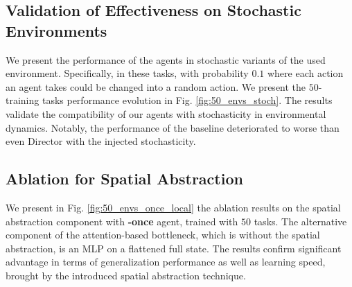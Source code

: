 \subsection{Validation of Effectiveness on Stochastic Environments}
We present the performance of the agents in stochastic variants of the used environment. Specifically, in these tasks, with probability $0.1$ where each action an agent takes could be changed into a random action. We present the $50$-training tasks performance evolution in Fig. \ref{fig:50_envs_stoch}. The results validate the compatibility of our agents with stochasticity in environmental dynamics. Notably, the performance of the baseline deteriorated to worse than even Director with the injected stochasticity.

\begin{figure*}[htbp]
\centering
\hfill
{}
\hfill
{}
\hfill
{}
\hfill
{}

\caption{\small \textbf{Generalization Performance of agents in \textbf{stochastic} environments}: $\epsilon$-greedy style randomness is added to each primitive action with $\epsilon=0.1$. Each agent is trained with $50$ environments and each curve is processed from $20$ independent seed runs.}
\label{fig:50_envs_stoch}
\end{figure*}



\subsection{Ablation for Spatial Abstraction}
We present in Fig. \ref{fig:50_envs_once_local} the ablation results on the spatial abstraction component with \textbf{\agentshort{}-once} agent, trained with $50$ tasks. The alternative component of the attention-based bottleneck, which is without the spatial abstraction, is an MLP on a flattened full state. The results confirm significant advantage in terms of generalization performance as well as learning speed, brought by the introduced spatial abstraction technique.

